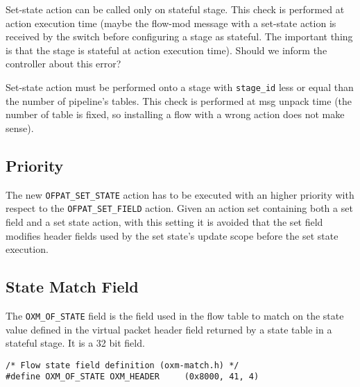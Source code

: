 Set-state action can be called only on stateful stage. This check is performed at action execution time (maybe the flow-mod message with a set-state action is received by the switch before configuring a stage as stateful. The important thing is that the stage is stateful at action execution time). Should we inform the controller about this error?

Set-state action must be performed onto a stage with \texttt{stage\_id} less or equal than the number of pipeline’s tables. This check is performed at msg unpack time (the number of table is fixed, so installing a flow with a wrong action does not make sense). 

\subsection{Priority}

The new \texttt{OFPAT\_SET\_STATE} action has to be executed with an higher priority with respect to the \texttt{OFPAT\_SET\_FIELD} action. Given an action set containing both a set field and a set state action, with this setting it is avoided that the set field modifies header fields used by the set state's update scope before the set state execution.


\subsection{State Match Field}
\label{sec:match_state}

The \texttt{OXM\_OF\_STATE} field is the field used in the flow table to match on the state value defined in the virtual packet header field returned by a state table in a stateful stage. It is a 32 bit field.


\begin{verbatim}
/* Flow state field definition (oxm-match.h) */
#define OXM_OF_STATE OXM_HEADER     (0x8000, 41, 4)
\end{verbatim}

